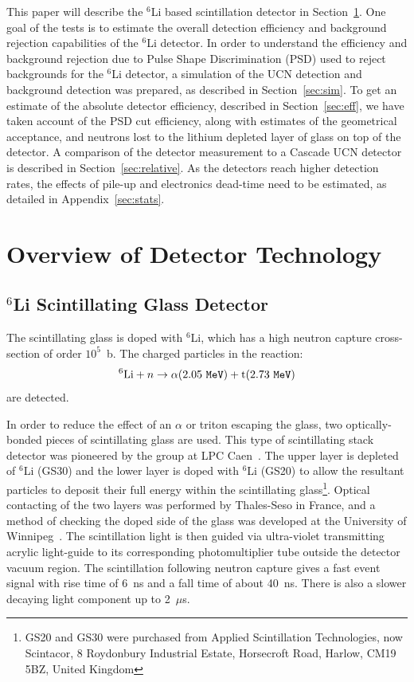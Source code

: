\documentclass[twocolumn]{bmcart}
\begin{document}
This paper will describe the $^{6}$Li based scintillation detector in
Section~\ref{sec:overview}.  One goal of the tests is to estimate the
overall detection efficiency and background rejection capabilities of
the $^{6}$Li detector.  In order to understand the efficiency and
background rejection due to Pulse Shape Discrimination (PSD) used to
reject backgrounds for the $^{6}$Li detector, a simulation of the UCN
detection and background detection was prepared, as described in
Section~\ref{sec:sim}.  To get an estimate of the absolute detector
efficiency, described in Section~\ref{sec:eff}, we have taken account
of the PSD cut efficiency, along with estimates of the geometrical
acceptance, and neutrons lost to the lithium depleted layer of glass
on top of the detector.  A comparison of the detector measurement to a
Cascade UCN detector is described in Section~\ref{sec:relative}.  As
the detectors reach higher detection rates, the effects of pile-up and
electronics dead-time need to be estimated, as detailed
in Appendix~\ref{sec:stats}.

\section{Overview of Detector Technology}\label{sec:overview}


\subsection{$^6$Li Scintillating Glass Detector}

The scintillating glass is doped with $^6$Li, which has a high neutron
capture cross-section of order $10^5$~b.  The charged particles in the
reaction:
\begin{equation}
^6{\rm Li} + n \rightarrow \alpha (2.05\ {\tt MeV}) + {\rm t} (2.73\ {\tt MeV})
\end{equation}
are detected. 

In order to reduce the effect of an $\alpha$ or triton escaping the
glass, two optically-bonded pieces of scintillating glass are used.
This type of scintillating stack detector was pioneered by the group
at LPC Caen~\cite{ban, ban05, afach, gban2016}. The upper layer is depleted of
$^6$Li (GS30) and the lower layer is doped with $^6$Li (GS20) to allow
the resultant particles to deposit their full energy within the
scintillating glass\footnote{GS20 and GS30 were purchased from Applied
  Scintillation Technologies, now Scintacor, 8 Roydonbury Industrial
  Estate, Horsecroft Road, Harlow, CM19 5BZ, United Kingdom}.  Optical
contacting of the two layers was performed by Thales-Seso in France,
and a method of checking the doped side of the glass was developed at
the University of Winnipeg~\cite{jamieson}.  The scintillation light is
then guided via ultra-violet transmitting acrylic light-guide to its
corresponding photomultiplier tube outside the detector vacuum region.
The scintillation following neutron capture gives a fast event signal
with rise time of 6~ns and a fall time of about 40~ns.  There is also
a slower decaying light component up to 2~$\mu$s.
\end{document}
